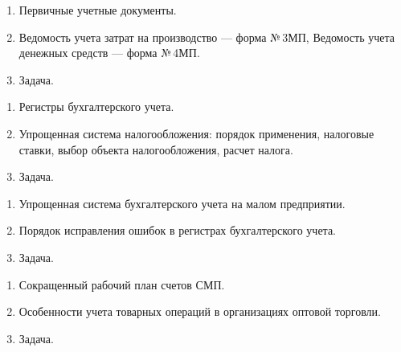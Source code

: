 \newpage


\shapkFull
\setcounter{zad}{0}

\begin{enumerate}
	\item Первичные учетные документы.

	\item Ведомость учета затрат на производство --- форма №\,3МП, Ведомость учета денежных средств --- форма №\,4МП.

	\item Задача.
\end{enumerate}

\newpage


\shapkFull
\setcounter{zad}{0}

\begin{enumerate}
	\item Регистры бухгалтерского учета.

	\item Упрощенная система налогообложения: порядок применения, налоговые ставки, выбор объекта налогообложения, расчет налога.

	\item Задача.
\end{enumerate}

\newpage


\shapkFull
\setcounter{zad}{0}

\begin{enumerate}
	\item Упрощенная система бухгалтерского учета на малом предприятии.

	\item Порядок исправления ошибок в регистрах бухгалтерского учета.

	\item Задача.
\end{enumerate}

\newpage


\shapkFull
\setcounter{zad}{0}

\begin{enumerate}
	\item Сокращенный рабочий план счетов СМП.

	\item Особенности учета товарных операций в организациях оптовой торговли.

	\item Задача.
\end{enumerate}


